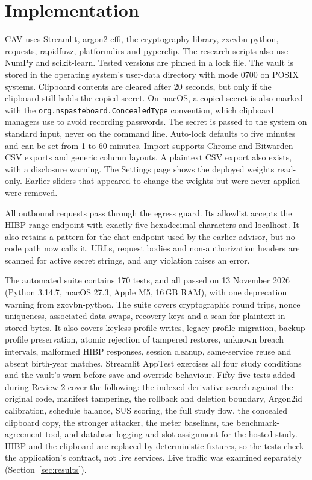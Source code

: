 \documentclass[conference]{IEEEtran}
\begin{document}
\section{Implementation}
\label{sec:impl}
CAV uses Streamlit, argon2-cffi, the cryptography library, zxcvbn-python, requests, rapidfuzz, platformdirs and pyperclip. The research scripts also use NumPy and scikit-learn. Tested versions are pinned in a lock file. The vault is stored in the operating system's user-data directory with mode 0700 on POSIX systems. Clipboard contents are cleared after 20 seconds, but only if the clipboard still holds the copied secret. On macOS, a copied secret is also marked with the \texttt{org.nspasteboard.ConcealedType} convention, which clipboard managers use to avoid recording passwords. The secret is passed to the system on standard input, never on the command line. Auto-lock defaults to five minutes and can be set from 1 to 60 minutes. Import supports Chrome and Bitwarden CSV exports and generic column layouts. A plaintext CSV export also exists, with a disclosure warning. The Settings page shows the deployed weights read-only. Earlier sliders that appeared to change the weights but were never applied were removed.

All outbound requests pass through the egress guard. Its allowlist accepts the HIBP range endpoint with exactly five hexadecimal characters and localhost. It also retains a pattern for the chat endpoint used by the earlier advisor, but no code path now calls it. URLs, request bodies and non-authorization headers are scanned for active secret strings, and any violation raises an error.

The automated suite contains 170 tests, and all passed on 13 November 2026 (Python 3.14.7, macOS 27.3, Apple M5, 16\,GB RAM), with one deprecation warning from zxcvbn-python. The suite covers cryptographic round trips, nonce uniqueness, associated-data swaps, recovery keys and a scan for plaintext in stored bytes. It also covers keyless profile writes, legacy profile migration, backup profile preservation, atomic rejection of tampered restores, unknown breach intervals, malformed HIBP responses, session cleanup, same-service reuse and absent birth-year matches. Streamlit AppTest exercises all four study conditions and the vault's warn-before-save and override behaviour. Fifty-five tests added during Review 2 cover the following: the indexed derivative search against the original code, manifest tampering, the rollback and deletion boundary, Argon2id calibration, schedule balance, SUS scoring, the full study flow, the concealed clipboard copy, the stronger attacker, the meter baselines, the benchmark-agreement tool, and database logging and slot assignment for the hosted study. HIBP and the clipboard are replaced by deterministic fixtures, so the tests check the application's contract, not live services. Live traffic was examined separately (Section~\ref{sec:results}).
\end{document}
